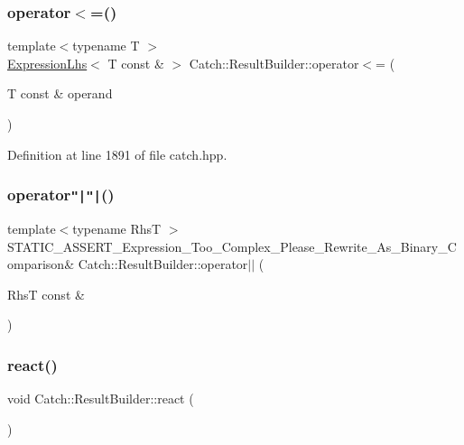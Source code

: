 \subsubsection{\texorpdfstring{operator$<$=()}{operator<=()}\hspace{0.1cm}{\footnotesize\ttfamily [2/2]}}
{\footnotesize\ttfamily template$<$typename T $>$ \\
\hyperlink{class_catch_1_1_expression_lhs}{Expression\+Lhs}$<$ T const  \& $>$ Catch\+::\+Result\+Builder\+::operator$<$= (\begin{DoxyParamCaption}\item[{T const \&}]{operand }\end{DoxyParamCaption})\hspace{0.3cm}{\ttfamily [inline]}}



Definition at line 1891 of file catch.\+hpp.

\hypertarget{class_catch_1_1_result_builder_ad489243e89e9f0ec3cb1f95392a537de}{}\label{class_catch_1_1_result_builder_ad489243e89e9f0ec3cb1f95392a537de} 
\subsubsection{\texorpdfstring{operator\texttt{"|}\texttt{"|}()}{operator||()}}
{\footnotesize\ttfamily template$<$typename RhsT $>$ \\
S\+T\+A\+T\+I\+C\+\_\+\+A\+S\+S\+E\+R\+T\+\_\+\+Expression\+\_\+\+Too\+\_\+\+Complex\+\_\+\+Please\+\_\+\+Rewrite\+\_\+\+As\+\_\+\+Binary\+\_\+\+Comparison\& Catch\+::\+Result\+Builder\+::operator$\vert$$\vert$ (\begin{DoxyParamCaption}\item[{RhsT const \&}]{ }\end{DoxyParamCaption})}

\hypertarget{class_catch_1_1_result_builder_a3085cdc46533d45bed6f652a2ac295c0}{}\label{class_catch_1_1_result_builder_a3085cdc46533d45bed6f652a2ac295c0} 
\subsubsection{\texorpdfstring{react()}{react()}}
{\footnotesize\ttfamily void Catch\+::\+Result\+Builder\+::react (\begin{DoxyParamCaption}{ }\end{DoxyParamCaption})}

